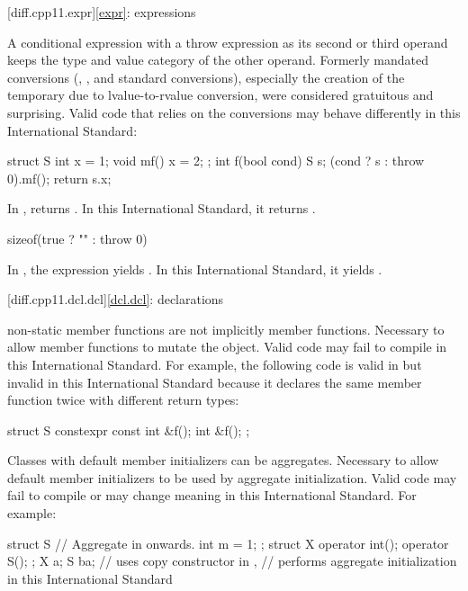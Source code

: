 [diff.cpp11.expr]{\ref{expr}: expressions}

\change
A conditional expression with a throw expression as its second or third
operand keeps the type and value category of the other operand.
\rationale
Formerly mandated conversions (,
, and 
standard conversions), especially the creation of the temporary due to
lvalue-to-rvalue conversion, were considered gratuitous and surprising.
\effect
Valid \CppXI{} code that relies on the conversions may behave differently
in this International Standard:

\begin{codeblock}
struct S {
  int x = 1;
  void mf() { x = 2; }
};
int f(bool cond) {
  S s;
  (cond ? s : throw 0).mf();
  return s.x;
}
\end{codeblock}

In \CppXI{},  returns . In this International Standard,
it returns .

\begin{codeblock}
sizeof(true ? "" : throw 0)
\end{codeblock}

In \CppXI{}, the expression yields . In this
International Standard, it yields .

[diff.cpp11.dcl.dcl]{\ref{dcl.dcl}: declarations}

\change
{} non-static member functions are not implicitly
 member functions.
\rationale
Necessary to allow  member functions to mutate
the object.
\effect
Valid \CppXI{} code may fail to compile in this International Standard.
For example, the following code is valid in \CppXI{}
but invalid in this International Standard because it declares the same member
function twice with different return types:
\begin{codeblock}
struct S {
  constexpr const int &f();
  int &f();
};
\end{codeblock}

\change
Classes with default member initializers can be aggregates.
\rationale
Necessary to allow default member initializers to be used
by aggregate initialization.
\effect
Valid \CppXI{} code may fail to compile or may change meaning in this International Standard.
For example:
\begin{codeblock}
struct S {          // Aggregate in \CppXIV{} onwards.
  int m = 1;
};
struct X {
  operator int();
  operator S();
};
X a{};
S b{a};             // uses copy constructor in \CppXI{},
                    // performs aggregate initialization in this International Standard
\end{codeblock}

